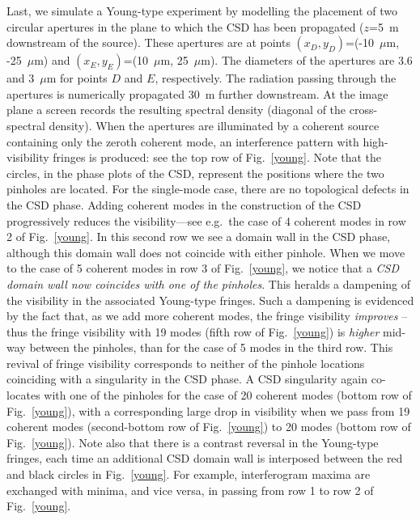 \documentclass[%
 reprint,
 amsmath,amssymb,
 aps,
]{revtex4-1}
\begin{document}
Last, we  simulate a Young-type experiment by modelling the placement of two circular apertures in the plane to which the CSD has been propagated ($z$=5~m downstream of the source). These apertures are at points $(x_D,y_D)$=(-10~$\mu$m, -25~$\mu$m) and  $(x_E,y_E)$=(10~$\mu$m, 25~$\mu$m). The diameters of the apertures are 3.6 and 3~$\mu$m for points $D$ and $E$, respectively. The radiation passing through the apertures is numerically propagated 30~m further downstream. At the image plane a screen records the resulting spectral density (diagonal of the cross-spectral density). When the apertures are illuminated by a coherent source containing only the zeroth coherent mode, an interference pattern with high-visibility fringes is produced: see the top row of Fig.~\ref{young}. Note that the circles, in the phase plots of the CSD, represent the positions where the two pinholes are located.  For the single-mode case, there are no topological defects in the CSD phase.  Adding coherent modes in the construction of the CSD progressively reduces the visibility---see e.g.~the case of 4 coherent modes in row 2 of Fig.~\ref{young}.  In this second row we see a domain wall in the CSD phase, although this domain wall does not coincide with either pinhole.  When we move to the case of 5 coherent modes in row 3 of Fig.~\ref{young}, we notice that a {\em CSD domain wall now coincides with one of the pinholes}.  This heralds a dampening of the visibility in the associated Young-type fringes.  Such a dampening is evidenced by the fact that, as we add more coherent modes, the fringe visibility {\em improves} -- thus the fringe visibility with 19 modes (fifth row of Fig.~\ref{young}) is {\em higher} mid-way between the pinholes, than for the case of 5 modes in the third row.  This revival of fringe visibility corresponds to neither of the pinhole locations coinciding with a singularity in the CSD phase.  A CSD singularity again co-locates with one of the pinholes for the case of 20 coherent modes (bottom row of Fig.~\ref{young}), with a corresponding large drop in visibility when we pass from  19 coherent modes (second-bottom row of Fig.~\ref{young}) to 20 modes (bottom row of Fig.~\ref{young}).  Note also that there is a contrast reversal in the Young-type fringes, each time an additional CSD domain wall is interposed between the red and black circles in Fig.~\ref{young}.  For example, interferogram maxima are exchanged with minima, and vice versa, in passing from row 1 to row 2 of Fig.~\ref{young}.  
\end{document}
